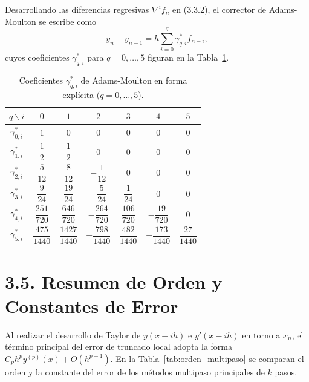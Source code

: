 Desarrollando las diferencias regresivas $\nabla^i f_n$ en (3.3.2), el corrector de Adams-Moulton se escribe como
\begin{equation*}
    y_n - y_{n-1} = h \sum_{i=0}^{q} \gamma_{q,i}^* f_{n-i},
    \tag{3.3.5}
\end{equation*}
cuyos coeficientes $\gamma_{q,i}^*$ para $q = 0, \dots, 5$ figuran en la Tabla~\ref{tab:gamma_qi_am}.

\begin{table}[htbp]
    \centering
    \caption{Coeficientes $\gamma_{q,i}^*$ de Adams-Moulton en forma explícita ($q = 0, \dots, 5$).}
    \label{tab:gamma_qi_am}
    \renewcommand{\arraystretch}{1.4}
    \small
    \begin{tabular}{ccccccc}
        \toprule
        $q \backslash i$ & $0$ & $1$ & $2$ & $3$ & $4$ & $5$ \\
        \midrule
        $\gamma_{0,i}^*$ & $1$ & $0$ & $0$ & $0$ & $0$ & $0$ \\[0.2em]
        $\gamma_{1,i}^*$ & $\dfrac{1}{2}$ & $\dfrac{1}{2}$ & $0$ & $0$ & $0$ & $0$ \\[0.4em]
        $\gamma_{2,i}^*$ & $\dfrac{5}{12}$ & $\dfrac{8}{12}$ & $-\dfrac{1}{12}$ & $0$ & $0$ & $0$ \\[0.4em]
        $\gamma_{3,i}^*$ & $\dfrac{9}{24}$ & $\dfrac{19}{24}$ & $-\dfrac{5}{24}$ & $\dfrac{1}{24}$ & $0$ & $0$ \\[0.4em]
        $\gamma_{4,i}^*$ & $\dfrac{251}{720}$ & $\dfrac{646}{720}$ & $-\dfrac{264}{720}$ & $\dfrac{106}{720}$ & $-\dfrac{19}{720}$ & $0$ \\[0.4em]
        $\gamma_{5,i}^*$ & $\dfrac{475}{1440}$ & $\dfrac{1427}{1440}$ & $-\dfrac{798}{1440}$ & $\dfrac{482}{1440}$ & $-\dfrac{173}{1440}$ & $\dfrac{27}{1440}$ \\
        \bottomrule
    \end{tabular}
\end{table}

\section*{3.5. Resumen de Orden y Constantes de Error}

Al realizar el desarrollo de Taylor de $y(x - ih)$ e $y'(x - ih)$ en torno a $x_n$, el término principal del error de truncado local adopta la forma $C_p h^p y^{(p)}(x) + O(h^{p+1})$. En la Tabla~\ref{tab:orden_multipaso} se comparan el orden y la constante del error de los métodos multipaso principales de $k$ pasos.

